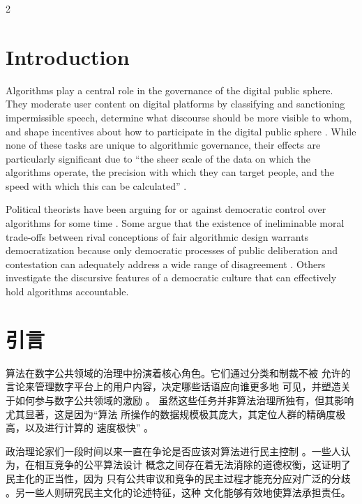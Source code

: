 \documentclass[12pt,a4paper]{article}
\begin{document}


\begin{paracol}{2}

\section*{Introduction}

Algorithms play a central role in the governance of the digital public sphere. 
They moderate user content on digital platforms by classifying and sanctioning 
impermissible speech, determine what discourse should be more visible to whom, 
and shape incentives about how to participate in the digital public sphere 
\citep{caplan2018, gorwa2020}. While none of these tasks are unique to 
algorithmic governance, their effects are particularly significant due to ``the 
sheer scale of the data on which the algorithms operate, the precision with which 
they can target people, and the speed with which this can be calculated'' 
\citep[114]{christiano2022}.

Political theorists have been arguing for or against democratic control over 
algorithms for some time \citep{binns2018, wong2020}. Some argue that the 
existence of ineliminable moral trade-offs between rival conceptions of fair 
algorithmic design warrants democratization because only democratic processes 
of public deliberation and contestation can adequately address a wide range 
of disagreement \citep[229]{wong2020}. Others investigate the discursive 
features of a democratic culture that can effectively hold algorithms 
accountable.

\switchcolumn

\section*{引言}

算法在数字公共领域的治理中扮演着核心角色。它们通过分类和制裁不被
允许的言论来管理数字平台上的用户内容，决定哪些话语应向谁更多地
可见，并塑造关于如何参与数字公共领域的激励 \citep{caplan2018, gorwa2020}。
虽然这些任务并非算法治理所独有，但其影响尤其显著，这是因为``算法
所操作的数据规模极其庞大，其定位人群的精确度极高，以及进行计算的
速度极快'' \citep[114]{christiano2022}。

政治理论家们一段时间以来一直在争论是否应该对算法进行民主控制
\citep{binns2018, wong2020}。一些人认为，在相互竞争的公平算法设计
概念之间存在着无法消除的道德权衡，这证明了民主化的正当性，因为
只有公共审议和竞争的民主过程才能充分应对广泛的分歧
\citep[229]{wong2020}。另一些人则研究民主文化的论述特征，这种
文化能够有效地使算法承担责任。

\end{paracol}
\end{document}
